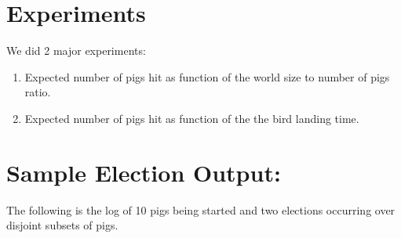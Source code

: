 \documentclass[]{article}
\begin{document}
\section{Experiments}
We did 2 major experiments:
\begin{enumerate}[1.]
\item
  Expected number of pigs hit as function of the world size to number of pigs ratio.
\item
  Expected number of pigs hit as function of the the bird landing time.
\end{enumerate} 

\section{Sample Election Output:}

The following is the log of 10 pigs being started and two elections occurring over disjoint subsets of pigs.
\end{document}
